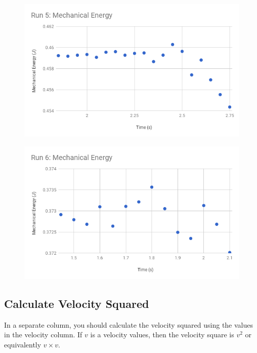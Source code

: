 \begin{figure} \label{figure.07.run.5.e}
    \centering
    \includegraphics[scale=0.71]{image/07-mechanic/run-5-energy.png}
    \caption{}
\end{figure}
\begin{figure} \label{figure.07.run.6.e}
    \centering
    \includegraphics[scale=0.71]{image/07-mechanic/run-6-energy.png}
    \caption{}
\end{figure}
\subsection{Calculate Velocity Squared}
In a separate column, you should calculate the velocity squared using the values in the velocity column. If $v$ is a velocity values, then the velocity square is $v^2$ or equivalently $v \times v$.
